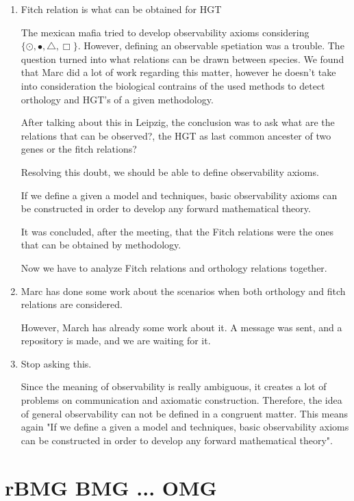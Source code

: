 \documentclass[11pt]{article}
\begin{document}
\begin{enumerate}

\item Fitch relation is what can be obtained for HGT

The mexican mafia tried to develop observability axioms considering $ \{ \odot , \bullet , \triangle , \Box \} $. However, defining an observable spetiation was a trouble.
The question turned into what relations can be drawn between species. We found that Marc did a lot of work regarding this matter, however he doesn't take into consideration the biological contrains of the used methods to detect orthology and HGT's of a given methodology.

After talking about this in Leipzig, the conclusion was to ask what are the relations that can be observed?, the HGT as last common ancester of two genes or the fitch relations?

Resolving this doubt, we should be able to define observability axioms.

If we define a given a model and techniques, basic observability axioms can be constructed in order to develop any forward mathematical theory.

It was concluded, after the meeting, that the Fitch relations were the ones that can be obtained by methodology.

Now we have to analyze Fitch relations and orthology relations together.

\item Marc has done some work about the scenarios when both orthology and fitch relations are considered.

However, March has already some work about it. A message was sent, and a repository is made, and we are waiting for it.

\item Stop asking this.

Since the meaning of observability is really ambiguous, it creates a lot of problems on communication and axiomatic construction. Therefore, the idea of general observability can not be defined in a congruent matter. This means again "If we define a given a model and techniques, basic observability axioms can be constructed in order to develop any forward mathematical theory".


\end{enumerate}


\section{rBMG BMG ... OMG}
\end{document}
